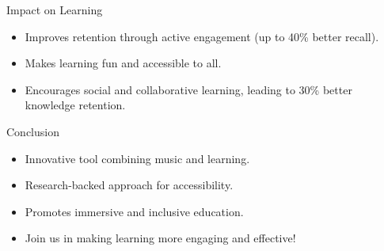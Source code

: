 \documentclass{beamer}
\begin{document}
\begin{frame}{Impact on Learning}
    \begin{itemize}
        \item Improves retention through active engagement (up to 40\% better recall).
        \item Makes learning fun and accessible to all.
        \item Encourages social and collaborative learning, leading to 30\% better knowledge retention.
    \end{itemize}
\end{frame}

\begin{frame}{Conclusion}
    \begin{itemize}
        \item Innovative tool combining music and learning.
        \item Research-backed approach for accessibility.
        \item Promotes immersive and inclusive education.
        \item Join us in making learning more engaging and effective!
    \end{itemize}
\end{frame}
\end{document}
